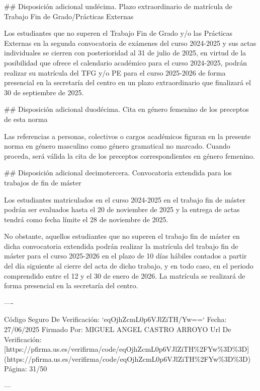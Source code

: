 \documentclass{article}
\begin{document}
\begin{itemize}
\begin{itemize}
\begin{scriptsize}
                  \#\# Disposición adicional undécima. Plazo extraordinario de matrícula de Trabajo Fin de Grado/Prácticas Externas

                  Los estudiantes que no superen el Trabajo Fin de Grado y/o las Prácticas Externas en la segunda convocatoria de exámenes del curso 2024-2025 y sus actas individuales se cierren con posterioridad al 31 de julio de 2025, en virtud de la posibilidad que ofrece el calendario académico para el curso 2024-2025, podrán realizar su matrícula del TFG y/o PE para el curso 2025-2026 de forma presencial en la secretaría del centro en un plazo extraordinario que finalizará el 30 de septiembre de 2025.

                  \#\# Disposición adicional duodécima. Cita en género femenino de los preceptos de esta norma

                  Las referencias a personas, colectivos o cargos académicos figuran en la presente norma en género masculino como género gramatical no marcado. Cuando proceda, será válida la cita de los preceptos correspondientes en género femenino.

                  \#\# Disposición adicional decimotercera. Convocatoria extendida para los trabajos de fin de máster

                  Los estudiantes matriculados en el curso 2024-2025 en el trabajo fin de máster podrán ser evaluados hasta el 20 de noviembre de 2025 y la entrega de actas tendrá como fecha límite el 28 de noviembre de 2025.

                  No obstante, aquellos estudiantes que no superen el trabajo fin de máster en dicha convocatoria extendida podrán realizar la matrícula del trabajo fin de máster para el curso 2025-2026 en el plazo de 10 días hábiles contados a partir del día siguiente al cierre del acta de dicho trabajo, y en todo caso, en el periodo comprendido entre el 12 y el 30 de enero de 2026. La matrícula se realizará de forma presencial en la secretaría del centro.

                  ----

                  Código Seguro De Verificación: `eqOjhZcmL0p6VJlZiTH/Yw==`
                  Fecha: 27/06/2025
                  Firmado Por: MIGUEL ANGEL CASTRO ARROYO
                  Url De Verificación: [https://pfirma.us.es/verifirma/code/eqOjhZcmL0p6VJlZiTH\%2FYw\%3D\%3D](https://pfirma.us.es/verifirma/code/eqOjhZcmL0p6VJlZiTH\%2FYw\%3D\%3D)
                  Página: 31/50

                  ---


\end{scriptsize}
\end{itemize}
\end{itemize}
\end{document}
